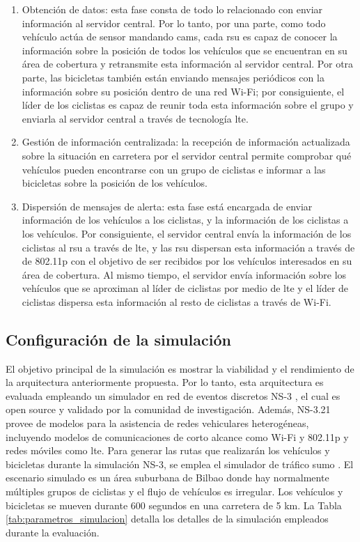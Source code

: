 \begin{enumerate}
	\item Obtención de datos: esta fase consta de todo lo relacionado con enviar
	información al servidor central. Por lo tanto, por una parte, como todo
	vehículo actúa de sensor mandando \gls{cam}s, cada \gls{rsu} es capaz de
	conocer la información sobre la posición de todos los vehículos que se
	encuentran en su área de cobertura y retransmite esta información al
	servidor central. Por otra parte, las bicicletas también están enviando
	mensajes periódicos con la información sobre su posición dentro de una red
	Wi-Fi; por consiguiente, el líder de los ciclistas es capaz de reunir toda
	esta información sobre el grupo y enviarla al servidor central a través de
	tecnología \gls{lte}.

	\item Gestión de información centralizada: la recepción de información
	actualizada sobre la situación en carretera por el servidor central permite
	comprobar qué vehículos pueden encontrarse con un grupo de ciclistas e
	informar a las bicicletas sobre la posición de los vehículos.

	\item Dispersión de mensajes de alerta: esta fase está encargada de enviar
	información de los vehículos a los ciclistas, y la información de los
	ciclistas a los vehículos. Por consiguiente, el servidor central envía la
	información de los ciclistas al \gls{rsu} a través de \gls{lte}, y las
	\gls{rsu} dispersan esta información a través de de \gls{802.11p} con el
	objetivo de ser recibidos por los vehículos interesados en su área de
	cobertura. Al mismo tiempo, el servidor envía información sobre los vehículos
	que se aproximan al líder de ciclistas por medio de \gls{lte} y el líder de
	ciclistas dispersa esta información al resto de ciclistas a través de Wi-Fi.
\end{enumerate}

\subsection{Configuración de la simulación}
El objetivo principal de la simulación es mostrar la viabilidad y el
rendimiento de la arquitectura anteriormente propuesta. Por lo tanto, esta
arquitectura es evaluada empleando un simulador en red de eventos discretos
NS-3 \cite{ns-3_simulator}, el cual es open source y validado por la comunidad
de investigación. Además, NS-3.21 provee de modelos para la asistencia de redes
vehiculares heterogéneas, incluyendo modelos de comunicaciones de corto alcance
como Wi-Fi y \gls{802.11p} y redes móviles como \gls{lte}. Para generar las
rutas que realizarán los vehículos y bicicletas durante la simulación NS-3,
se emplea el simulador de tráfico \gls{sumo} \cite{sumo_simulator}. El
escenario simulado es un área suburbana de Bilbao donde hay normalmente
múltiples grupos de ciclistas y el flujo de vehículos es irregular. Los
vehículos y bicicletas se mueven durante 600 segundos en una carretera de 5 km.
La Tabla \ref{tab:parametros_simulacion} detalla los detalles de la simulación
empleados durante la evaluación.

